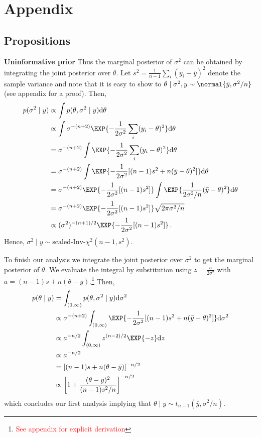 \appendix
\section{Appendix}

\subsection{Propositions}
\textbf{Uninformative prior}
Thus the marginal posterior of $\sigma^2$ can be obtained by integrating the joint posterior
over $\theta$. Let $s^2 = \frac{1}{n-1} \sum_i (y_i - \bar{y})^2$ denote the sample
variance and note that it is easy to show to
$\theta \mid \sigma^2, y \sim \normal{\bar{y}, \sigma^2/n}$ (see appendix for a proof).
Then,
\begin{align}
  p(\sigma^2 \mid y) &\propto \int p(\theta, \sigma^2 \mid y) \mathrm{d} \theta\\
  &\propto \int \sigma^{-(n+2)} \EXP{-\frac{1}{2\sigma^2}\sum_i (y_i - \theta)^2} \mathrm{d} \theta\\
  &= \sigma^{-(n+2)} \int \EXP{-\frac{1}{2\sigma^2}\sum_i (y_i - \theta)^2} \mathrm{d} \theta\\
  &= \sigma^{-(n+2)} \int \EXP{-\frac{1}{2\sigma^2}[(n-1) s^2 + n(\bar{y} - \theta)^2]} \mathrm{d} \theta\\
  &= \sigma^{-(n+2)} \EXP{-\frac{1}{2\sigma^2}[(n-1) s^2]} \int \EXP{\frac{1}{2\sigma^2/n}(\bar{y} - \theta)^2} \mathrm{d} \theta\\
  &= \sigma^{-(n+2)} \EXP{-\frac{1}{2\sigma^2}[(n-1) s^2]} \sqrt{2 \pi \sigma^2 / n} \\
  &\propto (\sigma^2)^{-(n+1)/2} \EXP{-\frac{1}{2\sigma^2}[(n-1) s^2]} \,.
\end{align}
Hence, $\sigma^2 \mid y \sim \text{scaled-Inv-} \chi^2(n-1, s^2)$.

To finish our analysis we integrate the joint posterior over $\sigma^2$ to get
the marginal posterior of $\theta$. We evaluate the integral by substitution using
$z = \frac{a}{2 \sigma^2}$ with $a = (n-1)s + n(\theta - \bar{y})$.\footnote{\textcolor{red}{See appendix for explicit derivation}}
Then,
\begin{align}
  p(\theta \mid y) &= \int_{(0, \infty)} p(\theta, \sigma^2 \mid y) \mathrm{d}\sigma^2\\
  &\propto \sigma^{-(n+2)} \int_{(0, \infty)} \EXP{-\frac{1}{2\sigma^2}[(n-1) s^2 + n(\bar{y} - \theta)^2]} \mathrm{d} \sigma^2\\
  &\propto a^{-n/2} \int_{(0, \infty)} z^{(n-2)/2}\EXP{-z} \mathrm{d}z\\
  &\propto a^{-n/2}\\
  &= [(n-1)s + n(\theta - \bar{y})]^{-n/2}\\
  &\propto \left[1 + \frac{(\theta - \bar{y})^2}{(n-1) s^2 / n}\right]^{-n/2} \,
\end{align}
which concludes our first analysis implying that $\theta \mid y \sim t_{n-1}(\bar{y}, \sigma^2/n)$.





